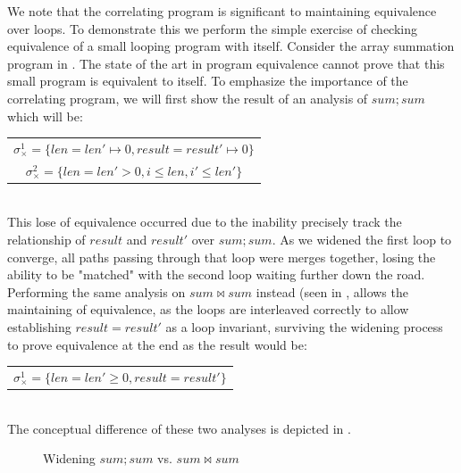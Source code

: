 

We note that the correlating program is significant to maintaining equivalence over loops. To demonstrate this we perform the simple exercise of checking equivalence of a small looping program with itself. Consider the array summation program in . The state of the art in program equivalence cannot prove that this small program is equivalent to itself. To emphasize the importance of the correlating program, we will first show the result of an analysis of $sum;sum$ which will be:
\\
\begin{tabular}{c}
$\sigma_{\times}^1 = \{len = len' \mapsto 0, result = result' \mapsto 0\}$
\\
$\sigma_{\times}^2 = \{len = len' > 0, i \leq len, i' \leq len'\}$
\end{tabular}
\\

This lose of equivalence occurred due to the inability precisely track the relationship of $result$ and $result'$ over $sum;sum$. As we widened the first loop to converge, all paths passing through that loop were merges together, losing the ability to be "matched" with the second loop waiting further down the road. Performing the same analysis on $sum \bowtie sum$ instead (seen in , allows the maintaining of equivalence, as the loops are interleaved correctly to allow establishing $result = result'$ as a loop invariant, surviving the widening process to prove equivalence at the end as the result would be:
\\
\begin{tabular}{c}
$\sigma_{\times}^1 = \{len = len' \geq 0, result = result'\}$
\end{tabular}
\\
The conceptual difference of these two analyses is depicted in .
\begin{figure}
\caption{Widening $sum ; sum$ vs. $sum \bowtie sum$}
\end{figure}

